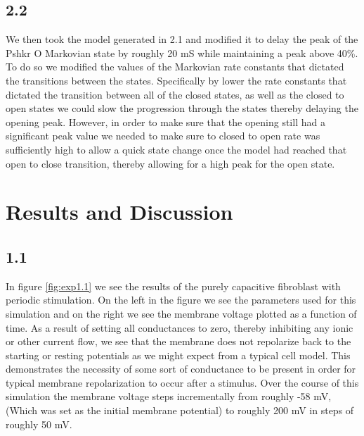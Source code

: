 \documentclass[12pt]{article}
\begin{document}
\subsection{2.2}
\par{}
We then took the model generated in 2.1 and modified it to delay the peak of the Pshkr O Markovian state by roughly 20 mS while maintaining a peak above 40\%. To do so we modified the values of the Markovian rate constants that dictated the transitions between the states. Specifically by lower the rate constants that dictated the transition between all of the closed states, as well as the closed to open states we could slow the progression through the states thereby delaying the opening peak. However, in order to make sure that the opening still had a significant peak value we needed to make sure to closed to open rate was sufficiently high to allow a quick state change once the model had reached that open to close transition, thereby allowing for a high peak for the open state.

\section{Results and Discussion}




\subsection{1.1}
\par{}
In figure \ref{fig:exp1.1} we see the results of the purely capacitive fibroblast with periodic stimulation. On the left in the figure we see the parameters used for this simulation and on the right we see the membrane voltage plotted as a function of time. As a result of setting all conductances to zero, thereby inhibiting any ionic or other current flow, we see that the membrane does not repolarize back to the starting or resting potentials as we might expect from a typical cell model. This demonstrates the necessity of some sort of conductance to be present in order for typical membrane repolarization to occur after a stimulus. Over the course of this simulation the membrane voltage steps incrementally from roughly -58 mV, (Which was set as the initial membrane potential) to roughly 200 mV in steps of roughly 50 mV. 
\end{document}
